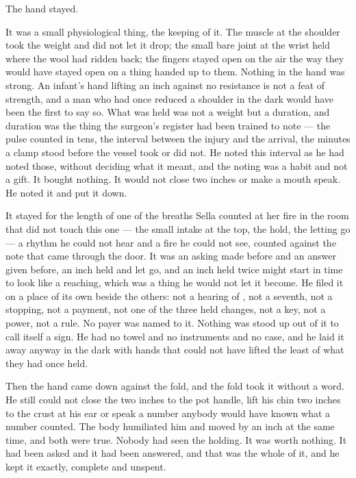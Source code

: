 The hand stayed.

It was a small physiological thing, the keeping of it. The muscle at the shoulder took the weight and did not let it drop; the small bare joint at the wrist held where the wool had ridden back; the fingers stayed open on the air the way they would have stayed open on a thing handed up to them. Nothing in the hand was strong. An infant's hand lifting an inch against no resistance is not a feat of strength, and a man who had once reduced a shoulder in the dark would have been the first to say so. What was held was not a weight but a duration, and duration was the thing the surgeon's register had been trained to note --- the pulse counted in tens, the interval between the injury and the arrival, the minutes a clamp stood before the vessel took or did not. He noted this interval as he had noted those, without deciding what it meant, and the noting was a habit and not a gift. It bought nothing. It would not close two inches or make a mouth speak. He noted it and put it down.

It stayed for the length of one of the breaths Sella counted at her fire in the room that did not touch this one --- the small intake at the top, the hold, the letting go --- a rhythm he could not hear and a fire he could not see, counted against the note that came through the door. It was an asking made before and an answer given before, an inch held and let go, and an inch held twice might start in time to look like a reaching, which was a thing he would not let it become. He filed it on a place of its own beside the others: not a hearing of , not a seventh, not a stopping, not a payment, not one of the three held changes, not a key, not a power, not a rule. No payer was named to it. Nothing was stood up out of it to call itself a sign. He had no towel and no instruments and no case, and he laid it away anyway in the dark with hands that could not have lifted the least of what they had once held.

Then the hand came down against the fold, and the fold took it without a word. He still could not close the two inches to the pot handle, lift his chin two inches to the crust at his ear or speak a number anybody would have known what a number counted. The body humiliated him and moved by an inch at the same time, and both were true. Nobody had seen the holding. It was worth nothing. It had been asked and it had been answered, and that was the whole of it, and he kept it exactly, complete and unspent.

